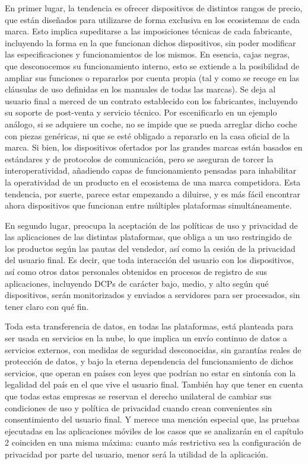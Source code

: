 En primer lugar, la tendencia es ofrecer dispositivos de distintos rangos de precio, que están diseñados para utilizarse de forma exclusiva en los ecosistemas de cada marca. Esto implica supeditarse a las imposiciones técnicas de cada fabricante, incluyendo la forma en la que funcionan dichos dispositivos, sin poder modificar las especificaciones y funcionamientos de los mismos. En esencia, cajas negras, que desconocemos su funcionamiento interno, esto se extiende a la posibilidad de ampliar sus funciones o repararlos por cuenta propia (tal y como se recoge en las cláusulas de uso definidas en los manuales de todas las marcas). Se deja al usuario final a merced de un contrato establecido con los fabricantes, incluyendo su soporte de post-venta y servicio técnico. Por escenificarlo en un ejemplo análogo, si se adquiere un coche, no se impide que se pueda arreglar dicho coche con piezas genéricas, ni que se esté obligado a repararlo en la casa oficial de la marca. Si bien, los dispositivos ofertados por las grandes marcas están basados en estándares y de protocolos de comunicación, pero se aseguran de torcer la interoperatividad, añadiendo capas de funcionamiento pensadas para inhabilitar la operatividad de un producto en el ecosistema de una marca competidora. Esta tendencia, por suerte, parece estar empezando a diluirse, y es más fácil encontrar ahora dispositivos que funcionan entre múltiples plataformas simultáneamente.

\vspace{1cm}

En segundo lugar, preocupa la aceptación de las políticas de uso y privacidad de las aplicaciones de las distintas plataformas, que obliga a un uso restringido de los productos según las pautas del vendedor, así como la cesión de la privacidad del usuario final. Es decir, que toda interacción del usuario con los dispositivos, así como otros datos personales obtenidos en procesos de registro de sus aplicaciones, incluyendo DCPs de carácter bajo, medio, y alto según qué dispositivos, serán monitorizados y enviados a servidores para ser procesados, sin tener claro con qué fin.

\vspace{1cm}

Toda esta transferencia de datos, en todas las plataformas, está planteada para ser usada en servicios en la nube, lo que implica un envío continuo de datos a servicios externos, con medidas de seguridad desconocidas, sin garantías reales de protección de datos, y bajo la eterna dependencia del funcionamiento de dichos servicios, que operan en países con leyes que podrían no estar en sintonía con la legalidad del país en el que vive el usuario final. También hay que tener en cuenta que todas estas empresas se reservan el derecho unilateral de cambiar sus condiciones de uso y política de privacidad cuando crean convenientes sin consentimiento del usuario final. Y merece una mención especial que, las pruebas ejecutadas en las aplicaciones móviles de los casos que se analizarán en el capítulo 2 coinciden en una misma máxima: cuanto más restrictiva sea la configuración de privacidad por parte del usuario, menor será la utilidad de la aplicación.

